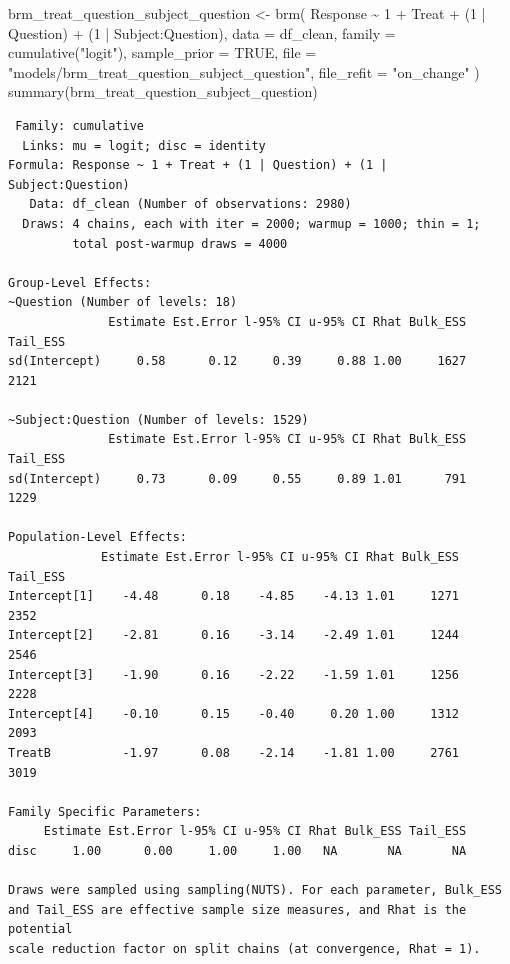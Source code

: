 \documentclass[
  12pt,
  a4paper,
  extrafontsizes,
  onecolumn,
  openright]{memoir}
\newenvironment{Shaded}{\begin{snugshade}}{\end{snugshade}}
\newcommand{\AttributeTok}[1]{\textcolor[rgb]{0.40,0.45,0.13}{#1}}
\newcommand{\ConstantTok}[1]{\textcolor[rgb]{0.56,0.35,0.01}{#1}}
\newcommand{\DecValTok}[1]{\textcolor[rgb]{0.68,0.00,0.00}{#1}}
\newcommand{\FunctionTok}[1]{\textcolor[rgb]{0.28,0.35,0.67}{#1}}
\newcommand{\NormalTok}[1]{\textcolor[rgb]{0.00,0.23,0.31}{#1}}
\newcommand{\OtherTok}[1]{\textcolor[rgb]{0.00,0.23,0.31}{#1}}
\newcommand{\SpecialCharTok}[1]{\textcolor[rgb]{0.37,0.37,0.37}{#1}}
\newcommand{\StringTok}[1]{\textcolor[rgb]{0.13,0.47,0.30}{#1}}
\begin{document}
\begin{Shaded}
\begin{Highlighting}[]
\NormalTok{brm\_treat\_question\_subject\_question }\OtherTok{\textless{}{-}} \FunctionTok{brm}\NormalTok{(}
\NormalTok{    Response }\SpecialCharTok{\textasciitilde{}} \DecValTok{1} \SpecialCharTok{+}\NormalTok{ Treat }\SpecialCharTok{+}\NormalTok{ (}\DecValTok{1} \SpecialCharTok{|}\NormalTok{ Question) }\SpecialCharTok{+}\NormalTok{ (}\DecValTok{1} \SpecialCharTok{|}\NormalTok{ Subject}\SpecialCharTok{:}\NormalTok{Question),}
    \AttributeTok{data =}\NormalTok{ df\_clean,}
    \AttributeTok{family =} \FunctionTok{cumulative}\NormalTok{(}\StringTok{"logit"}\NormalTok{),}
    \AttributeTok{sample\_prior =} \ConstantTok{TRUE}\NormalTok{,}
    \AttributeTok{file =} \StringTok{"models/brm\_treat\_question\_subject\_question"}\NormalTok{,}
    \AttributeTok{file\_refit =} \StringTok{"on\_change"}
\NormalTok{)}
\FunctionTok{summary}\NormalTok{(brm\_treat\_question\_subject\_question)}
\end{Highlighting}
\end{Shaded}

\begin{verbatim}
 Family: cumulative 
  Links: mu = logit; disc = identity 
Formula: Response ~ 1 + Treat + (1 | Question) + (1 | Subject:Question) 
   Data: df_clean (Number of observations: 2980) 
  Draws: 4 chains, each with iter = 2000; warmup = 1000; thin = 1;
         total post-warmup draws = 4000

Group-Level Effects: 
~Question (Number of levels: 18) 
              Estimate Est.Error l-95% CI u-95% CI Rhat Bulk_ESS Tail_ESS
sd(Intercept)     0.58      0.12     0.39     0.88 1.00     1627     2121

~Subject:Question (Number of levels: 1529) 
              Estimate Est.Error l-95% CI u-95% CI Rhat Bulk_ESS Tail_ESS
sd(Intercept)     0.73      0.09     0.55     0.89 1.01      791     1229

Population-Level Effects: 
             Estimate Est.Error l-95% CI u-95% CI Rhat Bulk_ESS Tail_ESS
Intercept[1]    -4.48      0.18    -4.85    -4.13 1.01     1271     2352
Intercept[2]    -2.81      0.16    -3.14    -2.49 1.01     1244     2546
Intercept[3]    -1.90      0.16    -2.22    -1.59 1.01     1256     2228
Intercept[4]    -0.10      0.15    -0.40     0.20 1.00     1312     2093
TreatB          -1.97      0.08    -2.14    -1.81 1.00     2761     3019

Family Specific Parameters: 
     Estimate Est.Error l-95% CI u-95% CI Rhat Bulk_ESS Tail_ESS
disc     1.00      0.00     1.00     1.00   NA       NA       NA

Draws were sampled using sampling(NUTS). For each parameter, Bulk_ESS
and Tail_ESS are effective sample size measures, and Rhat is the potential
scale reduction factor on split chains (at convergence, Rhat = 1).
\end{verbatim}
\end{document}
